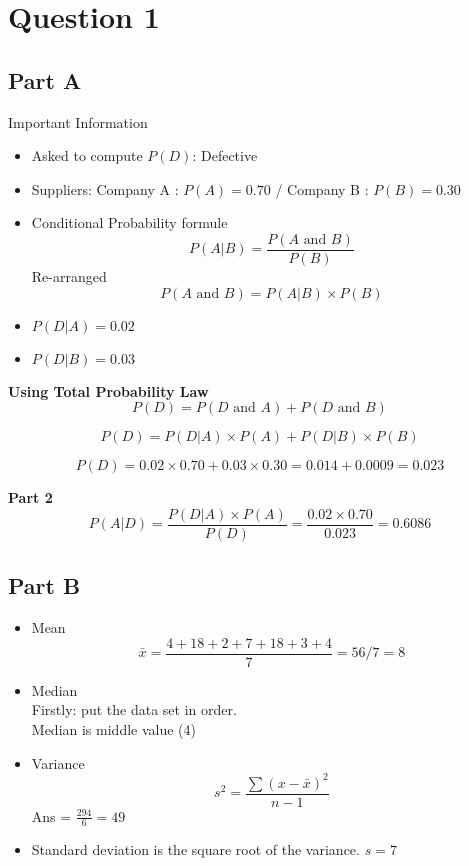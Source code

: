 \documentclass[]{article}
\title{}
\author{}
\begin{document}
\maketitle


\section*{Question 1}

\subsection*{Part A}
Important Information
\begin{itemize}
\item Asked to compute $P(D) $: Defective
\item Suppliers: Company A : $P(A) = 0.70$ / Company B : $P(B) = 0.30$
\item Conditional Probability formule
\[ P(A|B) = \frac{P(A \mbox{ and } B  )}{P(B)}\]
Re-arranged
\[P(A \mbox{ and } B  ) = P(A|B)\times P(B)\]
\item $P(D|A) = 0.02$
\item $P(D|B) = 0.03$
\end{itemize}
\textbf{Using Total Probability Law}
\[P(D) = P(D \mbox{ and } A) + P(D \mbox{ and } B  )\]

\[P(D) = P(D|A)\times P(A) + P(D|B)\times P(B)\]

\[P(D) = 0.02 \times 0.70 +  0.03 \times 0.30  = 0.014 + 0.0009 = 0.023\]

\textbf{Part 2}
\[P(A|D)  = \frac{P(D|A)\times P(A)}{P(D)}  = \frac{0.02 \times 0.70}{0.023} =  0.6086\]

\subsection*{Part B}
\begin{itemize}
\item Mean
\[\bar{x} =  \frac{4 + 18 + 2 + 7 +18 + 3  +4
}{7} =56/7 = 8 \]
\item Median\\
Firstly: put the data set in order.\\
Median is middle value (4)\\
\item Variance
\[s^2 = \frac{\sum (x-\bar{x})^2}{n-1}\]
Ans = $\frac{294}{6} = 49$
\item Standard deviation is the square root of the variance. $s=7$
\end{itemize}
\end{document}

